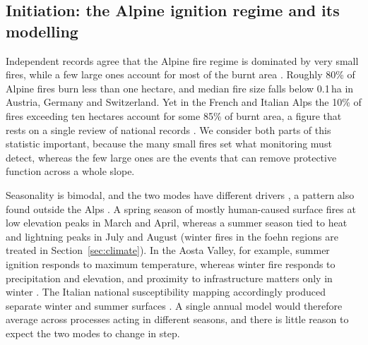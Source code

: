 \documentclass[11pt,a4paper]{article}
\begin{document}
\subsection{Initiation: the Alpine ignition regime and its modelling}

Independent records agree that the Alpine fire regime is dominated by very small fires, while a few large ones account for most of the burnt area \citep{muller_forest_2020, conedera_characterizing_2018, beloiu_climatedriven_2026, papathomakohle_towards_2025, jrc_advance_2026}. Roughly 80\% of Alpine fires burn less than one hectare, and median fire size falls below 0.1\,ha in Austria, Germany and Switzerland. Yet in the French and Italian Alps the 10\% of fires exceeding ten hectares account for some 85\% of burnt area, a figure that rests on a single review of national records \citep{muller_forest_2020}. We consider both parts of this statistic important, because the many small fires set what monitoring must detect, whereas the few large ones are the events that can remove protective function across a whole slope.

Seasonality is bimodal, and the two modes have different drivers \citep{muller_forest_2020, valese_wildfires_2011, schunk_forest_2013, vacchiano_modeling_2018, trucchia_defining_2022}, a pattern also found outside the Alps \citep{bercak_combination_2024}. A spring season of mostly human-caused surface fires at low elevation peaks in March and April, whereas a summer season tied to heat and lightning peaks in July and August (winter fires in the foehn regions are treated in Section~\ref{sec:climate}). In the Aosta Valley, for example, summer ignition responds to maximum temperature, whereas winter fire responds to precipitation and elevation, and proximity to infrastructure matters only in winter \citep{vacchiano_modeling_2018}. The Italian national susceptibility mapping accordingly produced separate winter and summer surfaces \citep{trucchia_defining_2022}. A single annual model would therefore average across processes acting in different seasons, and there is little reason to expect the two modes to change in step.
\end{document}
